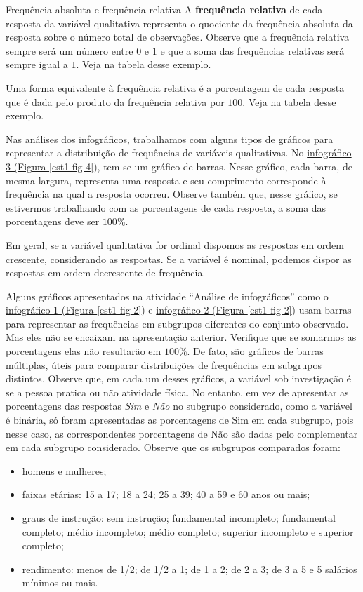 \begin{example}{Frequência absoluta e frequência relativa}
A \textbf{frequência relativa} de cada resposta da variável qualitativa representa o quociente da frequência absoluta da resposta sobre o número total de observações. Observe que a frequência relativa sempre será um número entre $0$ e $1$ e que a soma das frequências relativas será sempre igual a $1$. Veja na tabela desse exemplo.

Uma forma equivalente à frequência relativa é a porcentagem de cada resposta que é dada pelo produto da frequência relativa por $100$. Veja na tabela desse exemplo.
\end{example}

Nas análises dos infográficos, trabalhamos com alguns tipos de gráficos para representar a distribuição de frequências de variáveis qualitativas. No \hyperref[est1-fig-4]{infográfico 3 (Figura \ref{est1-fig-4}}), tem-se um gráfico de barras. Nesse gráfico, cada barra, de mesma largura, representa uma resposta e seu comprimento corresponde à frequência na qual a resposta ocorreu. Observe também que, nesse gráfico, se estivermos trabalhando com as porcentagens de cada resposta, a soma das porcentagens deve ser $100\%$.

Em geral, se a variável qualitativa for ordinal dispomos as respostas em ordem crescente, considerando as respostas. Se a variável é nominal, podemos dispor as respostas em ordem decrescente de frequência.

Alguns gráficos apresentados na atividade “Análise de infográficos” como o \hyperref[est1-fig-4]{infográfico 1 (Figura \ref{est1-fig-2}}) e \hyperref[est1-fig-4]{infográfico 2 (Figura \ref{est1-fig-2}}) usam barras para representar as frequências em subgrupos diferentes do conjunto observado. Mas eles não se encaixam na apresentação anterior. Verifique que se somarmos as porcentagens elas não resultarão em $100\%$. De fato, são gráficos de barras múltiplas, úteis para comparar distribuições de frequências em subgrupos distintos. Observe que, em cada um desses gráficos, a variável sob investigação é se a pessoa pratica ou não atividade física. No entanto, em vez de apresentar as porcentagens das respostas \textit{Sim} e \textit{Não} no subgrupo considerado, como a variável é binária, só foram apresentadas as porcentagens de Sim em cada subgrupo, pois nesse caso, as correspondentes porcentagens de Não são dadas pelo complementar em cada subgrupo considerado. Observe que os subgrupos comparados foram:

\begin{itemize}
\item homens e mulheres;
\item faixas etárias: 15 a 17; 18 a 24; 25 a 39; 40 a 59 e 60 anos ou mais;
\item graus de instrução: sem instrução; fundamental incompleto; fundamental completo; médio incompleto; médio completo; superior incompleto e superior completo;
\item rendimento: menos de 1/2; de 1/2 a 1; de 1 a 2; de 2 a 3; de 3 a 5 e 5 salários mínimos ou mais.
\end{itemize}

